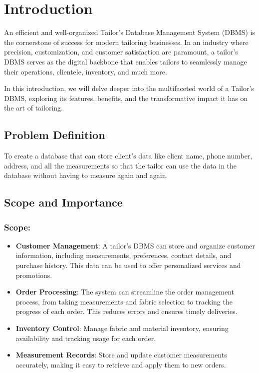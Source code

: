 \documentclass[12pt, letter paper]{report}
\begin{document}
{\chapter{Introduction}
\begin{spacing}{1.5}
An efficient and well-organized Tailor's Database Management System (DBMS) is the cornerstone of success for modern tailoring businesses. In an industry where precision, customization, and customer satisfaction are paramount, a tailor's DBMS serves as the digital backbone that enables tailors to seamlessly manage their operations, clientele, inventory, and much more.

 In this introduction, we will delve deeper into the multifaceted world of a Tailor's DBMS, exploring its features, benefits, and the transformative impact it has on the art of tailoring.
\end{spacing}
\section{Problem Definition} 
\begin{spacing}{1.5}
To create a database that can store client’s data like client name, phone number, address, and all the measurements so that the tailor can use the data in the database without having to measure again and again.
\end{spacing}
\section{Scope and Importance}
\subsection{Scope:}
\begin{spacing}{1.5}
\begin{itemize}
\item \textbf{Customer Management}: A tailor's DBMS can store and organize customer information, including measurements, preferences, contact details, and purchase history. This data can be used to offer personalized services and promotions.
\item \textbf{Order Processing}: The system can streamline the order management process, from taking measurements and fabric selection to tracking the progress of each order. This reduces errors and ensures timely deliveries.
\item\textbf{Inventory Control}: Manage fabric and material inventory, ensuring availability and tracking usage for each order.
\item\textbf{Measurement Records}: Store and update customer measurements accurately, making it easy to retrieve and apply them to new orders.
\\
\\

\end{itemize}
\end{spacing}}
\end{document}

